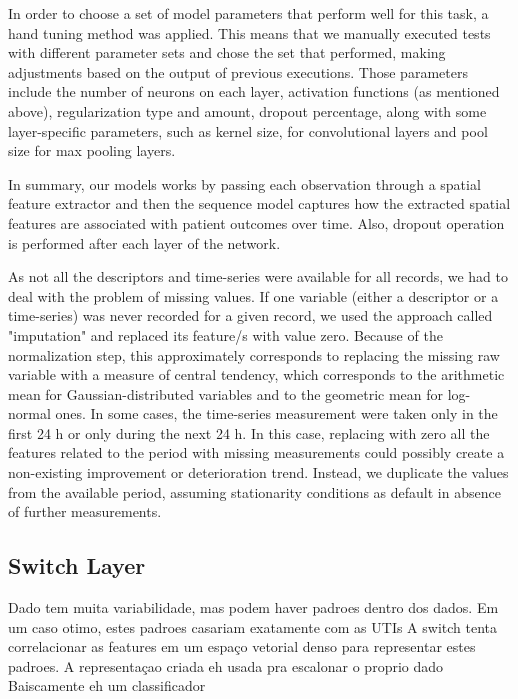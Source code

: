 In order to choose a set of model parameters that perform well for this task, a hand tuning method was applied. This means that we manually executed tests with different parameter sets and chose the set that performed, making adjustments based on the output of previous executions. Those parameters include the number of neurons on each layer, activation functions (as mentioned above), regularization type and amount, dropout percentage, along with some layer-specific parameters, such as kernel size, for convolutional layers and pool size for max pooling layers. 


In summary, our models works by passing each observation through a spatial feature extractor and then the sequence model captures how the extracted spatial features are associated with patient outcomes over time.
Also, dropout operation is performed after each layer of the network.

As not all the descriptors and time-series were available for all records, we had to deal with the problem of missing values. If one variable (either a descriptor or a time-series) was never recorded for a given record, we used the approach called "imputation" and replaced its feature/s with value zero. Because of the normalization step, this approximately corresponds to replacing the missing raw variable with a measure of central tendency, which corresponds to the arithmetic mean for Gaussian-distributed variables and to the geometric mean for log-normal ones. In some cases, the time-series measurement were taken only in the first 24 h or only during the next 24 h. In this case, replacing with zero all the features related to the period with missing measurements could possibly create a non-existing improvement or deterioration trend. Instead, we duplicate the values from the available period, assuming stationarity conditions as default in absence of further measurements.

\subsection{Switch Layer}


Dado tem muita variabilidade, mas podem haver padroes dentro dos dados. Em um caso otimo, estes padroes casariam exatamente com as UTIs
A switch tenta correlacionar as features em um espaço vetorial denso para representar estes padroes. A representaçao criada eh usada pra escalonar o proprio dado
Baiscamente eh um classificador


